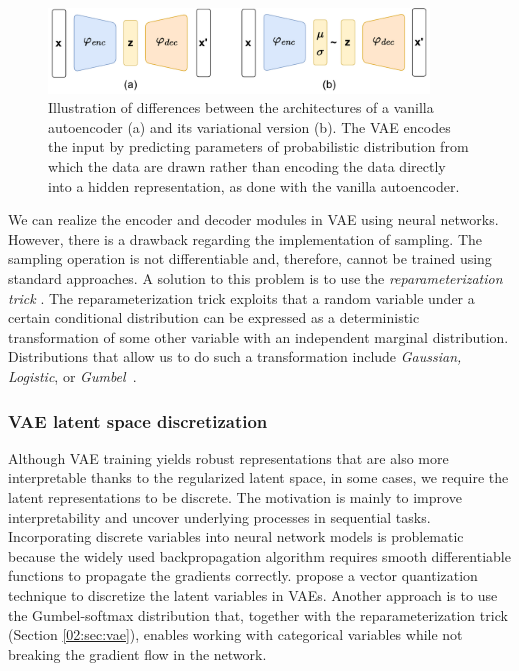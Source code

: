 \begin{figure}[t]
    \centering
    \includegraphics[width=0.9\textwidth]{images/enc-dec.pdf}
    \caption{Illustration of differences between the architectures of a vanilla autoencoder (a) and its variational version (b). The VAE encodes the input by predicting parameters of probabilistic distribution from which the data are drawn rather than encoding the data directly into a hidden representation, as done with the vanilla autoencoder.}
    \label{fig:vae-vs-ae}
\end{figure}
We can realize the encoder and decoder modules in VAE using neural networks.
However, there is a drawback regarding the implementation of sampling.
The sampling operation is not differentiable and, therefore, cannot be trained using standard approaches.
A solution to this problem is to use the \textit{reparameterization trick} \cite{kingma2013auto}.
The reparameterization trick exploits that a random variable under a certain conditional distribution can be expressed as a deterministic transformation of some other variable with an independent marginal distribution.
Distributions that allow us to do such a transformation include \textit{Gaussian, Logistic}, or \textit{Gumbel}~\cite{jang2016categorical}.

\subsubsection{VAE latent space discretization}
\label{02:sec:vae_discrete}
Although VAE training yields robust representations that are also more interpretable thanks to the regularized latent space, in some cases, we require the latent representations to be discrete.
The motivation is mainly to improve interpretability and uncover underlying processes in sequential tasks.
Incorporating discrete variables into neural network models is problematic because the widely used backpropagation algorithm requires smooth differentiable functions to propagate the gradients correctly.
\citet{van2017neural} propose a vector quantization technique to discretize the latent variables in VAEs.
Another approach is to use the Gumbel-softmax distribution \cite{jang2016categorical} that, together with the reparameterization trick (Section \ref{02:sec:vae}), enables working with categorical variables while not breaking the gradient flow in the network.

